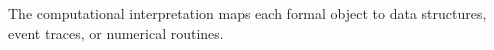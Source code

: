 The computational interpretation maps each formal object to data structures, event traces, or numerical routines.
